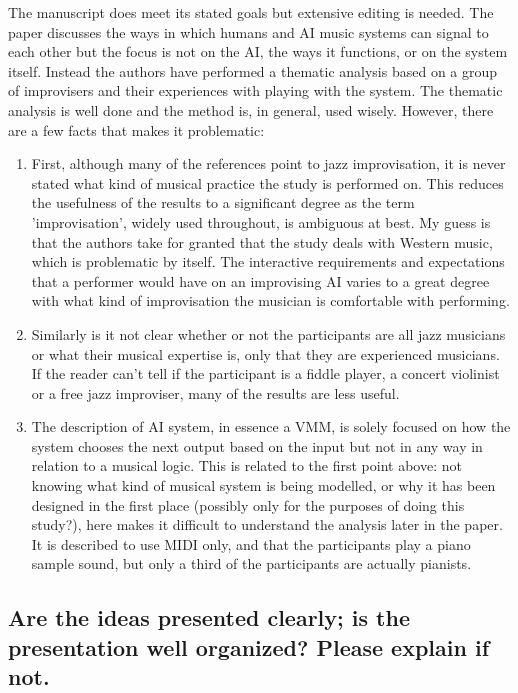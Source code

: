 \documentclass[11pt]{article}
\begin{document}
The manuscript does meet its stated goals but extensive editing is needed. The paper discusses the ways in which humans and AI music systems can signal to each other but the focus is not on the AI, the ways it functions, or on the system itself. Instead the authors have performed a thematic analysis based on a group of improvisers and their experiences with playing with the system. The thematic analysis is well done and the method is, in general, used wisely. However, there are a few facts that makes it problematic:
\begin{enumerate}
\item First, although many of the references point to jazz improvisation, it is never stated what kind of musical practice the study is performed on. This reduces the usefulness of the results to a significant degree as the term 'improvisation', widely used throughout, is ambiguous at best. My guess is that the authors take for granted that the study deals with Western music, which is problematic by itself. The interactive requirements and expectations that a performer would have on an improvising AI varies to a great degree with what kind of improvisation the musician is comfortable with performing.
\item Similarly is it not clear whether or not the participants are all jazz musicians or what their musical expertise is, only that they are experienced musicians. If the reader can't tell if the participant is a fiddle player, a concert violinist or a free jazz improviser, many of the results are less useful.
\item The description of AI system, in essence a VMM, is solely focused on how the system chooses the next output based on the input but not in any way in relation to a musical logic. This is related to the first point above: not knowing what kind of musical system is being modelled, or why it has been designed in the first place (possibly only for the purposes of doing this study?), here makes it difficult to understand the analysis later in the paper. It is described to use MIDI only, and that the participants play a piano sample sound, but only a third of the participants are actually pianists.
\end{enumerate}


\subsection*{Are the ideas presented clearly; is the presentation well organized? Please explain if not.}
\label{sec:org4698814}
\end{document}
